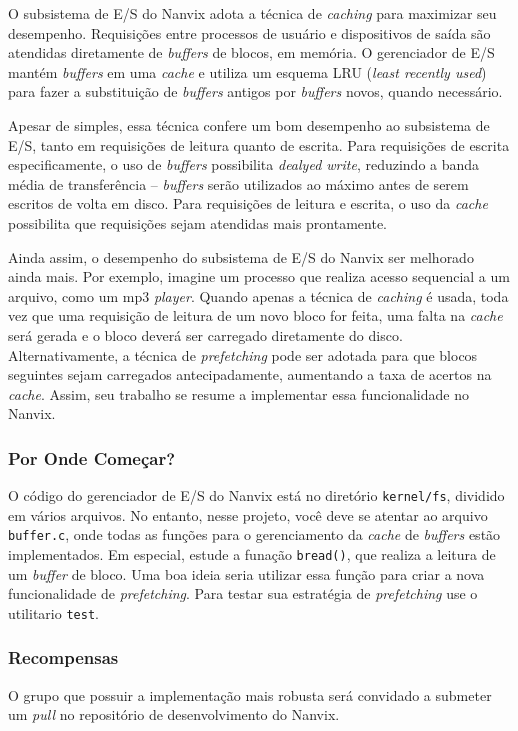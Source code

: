 \documentclass[11pt]{article}
\begin{document}
O subsistema de E/S do Nanvix adota a técnica de \textit{caching} para maximizar seu desempenho. Requisições entre processos de usuário e dispositivos de saída são atendidas diretamente de \textit{buffers} de blocos, em memória. O gerenciador de E/S mantém \textit{buffers} em uma \textit{cache} e utiliza um esquema LRU (\textit{least recently used}) para fazer a substituição de \textit{buffers} antigos por \textit{buffers} novos, quando necessário.

Apesar de simples, essa técnica confere um bom desempenho ao subsistema de E/S, tanto em requisições de leitura quanto de escrita. Para requisições de escrita especificamente, o uso de \textit{buffers} possibilita \textit{dealyed write}, reduzindo a banda média de transferência -- \textit{buffers} serão utilizados ao máximo antes de serem escritos de volta em disco. Para requisições de leitura e escrita, o uso da \textit{cache} possibilita que requisições sejam atendidas mais prontamente.

Ainda assim, o desempenho do subsistema de E/S do Nanvix ser melhorado ainda mais. Por exemplo, imagine um processo que realiza acesso sequencial a um arquivo, como um mp3 \textit{player}. Quando apenas a técnica de \textit{caching} é usada, toda vez que uma requisição de leitura de um novo bloco for feita, uma falta na \textit{cache} será gerada e o bloco deverá ser carregado diretamente do disco. Alternativamente, a técnica de \textit{prefetching} pode ser adotada para que blocos seguintes sejam carregados antecipadamente, aumentando a taxa de acertos na \textit{cache}. Assim, seu trabalho se resume a implementar essa funcionalidade no Nanvix.

\subsubsection*{Por Onde Começar?}

O código do gerenciador de E/S do Nanvix está no diretório \texttt{kernel/fs}, dividido em vários arquivos. No entanto, nesse projeto, você deve se atentar ao arquivo \texttt{buffer.c}, onde todas as funções para o gerenciamento da \textit{cache} de \textit{buffers} estão implementados. Em especial, estude a funação \texttt{bread()}, que realiza a leitura de um \textit{buffer} de bloco. Uma boa ideia seria utilizar essa função para criar a nova funcionalidade de \textit{prefetching}. Para testar sua estratégia de \textit{prefetching} use o utilitario \texttt{test}.

\subsubsection*{Recompensas}

O grupo que possuir a implementação mais robusta será convidado a submeter um \textit{pull} no repositório de desenvolvimento do Nanvix.
\end{document}
